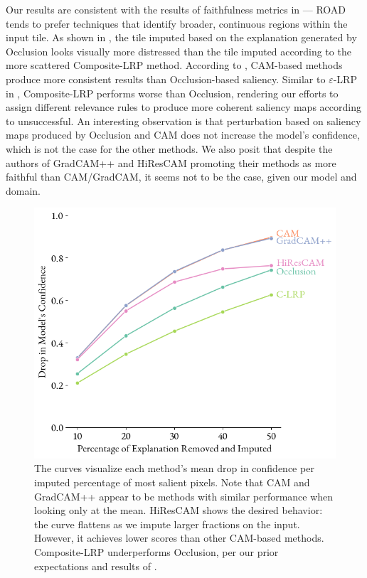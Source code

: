 Our results are consistent with the results of faithfulness metrics in \cite{gallo} --- ROAD tends to prefer techniques that identify broader, continuous regions within the input tile.
As shown in , the tile imputed based on the explanation generated by Occlusion looks visually more distressed than the tile imputed according to the more scattered Composite-LRP method.
According to , CAM-based methods produce more consistent results than Occlusion-based saliency.
Similar to $\varepsilon$-LRP in \cite{gallo}, Composite-LRP performs worse than Occlusion, rendering our efforts to assign different relevance rules to produce more coherent saliency maps according to \cite{lrp, lrp-alpha-beta} unsuccessful.
An interesting observation is that perturbation based on saliency maps produced by Occlusion and CAM does not increase the model's confidence, which is not the case for the other methods.
We also posit that despite the authors of GradCAM++ and HiResCAM promoting their methods as more faithful than CAM/GradCAM, it seems not to be the case, given our model and domain.

\begin{figure}
    \begin{center}
    \begin{minipage}{0.7\textwidth}
      \includegraphics[width=\textwidth]{img/road-curve.png}
    \end{minipage}
    \caption{
    The curves visualize each method's mean drop in confidence per imputed percentage of most salient pixels.
    Note that CAM and GradCAM++ appear to be methods with similar performance when looking only at the mean.
    HiResCAM shows the desired behavior: the curve flattens as we impute larger fractions on the input.
    However, it achieves lower scores than other CAM-based methods.
    Composite-LRP underperforms Occlusion, per our prior expectations and results of \cite{gallo}.
    }
    \label{fig:road-curve}
    \end{center}
\end{figure}

